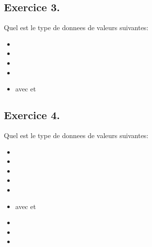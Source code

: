 \documentclass[letterpaper,10pt,french]{sphinxmanual}
\begin{document}
\subsection{Exercice 3.}
\label{\detokenize{exo2:exercice-3}}
\sphinxAtStartPar
Quel est le type de donnees de valeurs suivantes:
\begin{itemize}
\item {} 
\sphinxAtStartPar
{}

\item {} 
\sphinxAtStartPar
{}

\item {} 
\sphinxAtStartPar
{}

\item {} 
\sphinxAtStartPar
{}

\item {} 
\sphinxAtStartPar
{} avec  et 

\end{itemize}

\begin{sphinxVerbatim}[commandchars=\\\{\}]
\end{sphinxVerbatim}




\subsection{Exercice 4.}
\label{\detokenize{exo2:exercice-4}}
\sphinxAtStartPar
Quel est le type de donnees de valeurs suivantes:
\begin{itemize}
\item {} 
\sphinxAtStartPar
{}

\item {} 
\sphinxAtStartPar
{}

\item {} 
\sphinxAtStartPar
{}

\item {} 
\sphinxAtStartPar
{}

\item {} 
\sphinxAtStartPar
{}

\item {} 
\sphinxAtStartPar
{} avec  et 

\item {} 
\sphinxAtStartPar
{}

\item {} 
\sphinxAtStartPar
{}

\item {} 
\sphinxAtStartPar
{}

\end{itemize}
\end{document}

